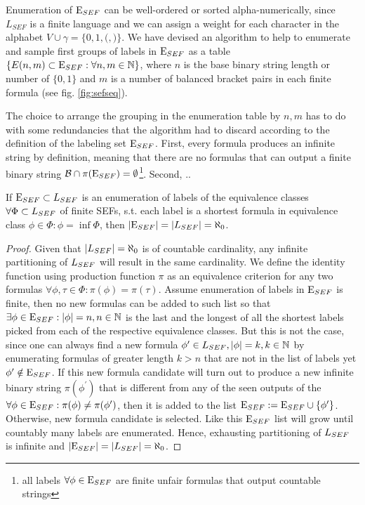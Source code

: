 Enumeration of $\mathrm{E}_{SEF}$ can be well-ordered or sorted alpha-numerically, since $L_{SEF}$ is a finite language and we can assign a weight for each character in the alphabet $V \cup \gamma = \{0,1,{(},{)}\}$. We have devised an algorithm to help to enumerate and sample first groups of labels in $\mathrm{E}_{SEF}$ as a table $\{E(n,m) \subset \mathrm{E}_{SEF} : \forall n,m \in \mathbb{N}\}$, where $n$ is the base binary string length or number of $\{0,1\}$ and $m$ is a number of balanced bracket pairs in each finite formula (see fig. \ref{fig:sefseq}).

The choice to arrange the grouping in the enumeration table by $n,m$ has to do with some redundancies that the algorithm had to discard according to the definition of the labeling set $\mathrm{E}_{SEF}$. First, every formula produces an infinite string by definition, meaning that there are no formulas that can output a finite binary string $\mathcal{B} \cap \pi(\mathrm{E}_{SEF}) = \emptyset$\footnote{all labels $\forall \phi \in \mathrm{E}_{SEF}$ are finite unfair formulas that output countable strings}. Second, ..


\begin{theorem}\label{th_count_enum_eqcls}
  If $\mathrm{E}_{SEF} \subset L_{SEF}$ is an enumeration of labels of the equivalence classes $\forall \Phi \subset L_{SEF}$ of finite SEFs, s.t. each label is a shortest formula in equivalence class $\phi \in \Phi : \phi = \inf \Phi$, then $|\mathrm{E}_{SEF}| = |L_{SEF}| = \aleph_0$.
\end{theorem}
\begin{proof}
  Given that $|L_{SEF}| = \aleph_0$ is of countable cardinality, any infinite partitioning of $L_{SEF}$ will result in the same cardinality. We define the identity function using production function $\pi$ as an equivalence criterion for any two formulas $\forall \phi, \tau \in \Phi : \pi(\phi) = \pi(\tau)$. Assume enumeration of labels in $\mathrm{E}_{SEF}$ is finite, then no new formulas can be added to such list so that $\exists \phi \in \mathrm{E}_{SEF} : |\phi| = n, n \in \mathbb{N}$ is the last and the longest of all the shortest labels picked from each of the respective equivalence classes. But this is not the case, since one can always find a new formula $\phi^\prime \in L_{SEF}, |\phi| = k, k \in \mathbb{N}$ by enumerating formulas of greater length $k > n$ that are not in the list of labels yet $\phi^\prime \notin \mathrm{E}_{SEF}$. If this new formula candidate will turn out to produce a new infinite binary string $\pi(\phi^\prime)$ that is different from any of the seen outputs of the $\forall \phi \in \mathrm{E}_{SEF} : \pi(\phi) \neq \pi(\phi^\prime)$, then it is added to the list $\mathrm{E}_{SEF} := \mathrm{E}_{SEF} \cup \{\phi^\prime\}$. Otherwise, new formula candidate is selected. Like this $\mathrm{E}_{SEF}$ list will grow until countably many labels are enumerated. Hence, exhausting partitioning of $L_{SEF}$ is infinite and $|\mathrm{E}_{SEF}| = |L_{SEF}| = \aleph_0$.
\end{proof}

